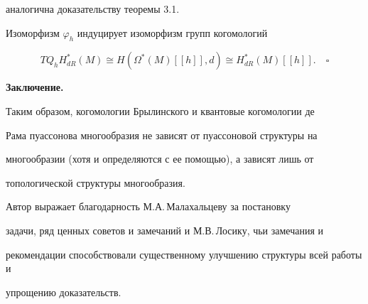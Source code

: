 аналогична доказательству теоремы 3.1.





Изоморфизм $\varphi_h$ индуцирует изоморфизм групп когомологий


$$


TQ_hH^*_{dR}(M) \cong H(\Omega^*(M)[[h]], d)\cong


H^*_{dR}(M)[[h]]. \quad\square


$$


\medskip








{\bf Заключение.}


Таким образом, когомологии Брылинского и квантовые когомологии де


Рама пуассонова многообразия не зависят от пуассоновой структуры на


многообразии (хотя и определяются с ее помощью), а зависят лишь от


топологической структуры многообразия.





Автор выражает благодарность М.А.\,Малахальцеву  за постановку


задачи, ряд ценных советов и замечаний и М.В.\,Лосику, чьи замечания и


рекомендации способствовали существенному улучшению структуры всей работы и 


упрощению доказательств.











